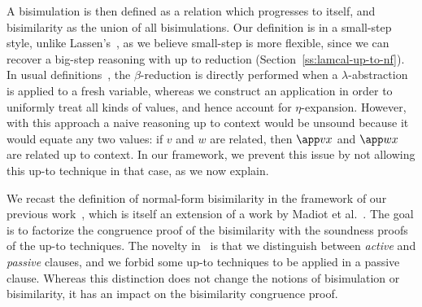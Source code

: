 \documentclass{lmcs}
\theoremstyle{defC}
\begin{document}
\noindent
A bisimulation is then defined as a relation which progresses to itself, and
bisimilarity as the union of all bisimulations. Our definition is in a
small-step style, unlike Lassen's~\cite{Lassen:LICS05}, as we believe small-step
is more flexible, since we can recover a big-step reasoning with up to reduction
(Section~\ref{ss:lamcal-up-to-nf}). In usual
definitions~\cite{Lassen:LICS05,Stoevring-Lassen:POPL07,Biernacki-al:HAL15}, the
$\beta$-reduction is directly performed when a $\lambda$-abstraction is applied
to a fresh variable, whereas we construct an application in order to uniformly
treat all kinds of values, and hence account for $\eta$-expansion. However, with
this approach a naive reasoning up to context would be unsound because it would
equate any two values: if $v$ and $w$ are related, then $\app v x$ and
$\app w x$ are related up to context.  In our framework, we prevent this issue
by not allowing this up-to technique in that case, as we now explain.

We recast the definition of normal-form bisimilarity in the framework of our
previous work~\cite{Aristizabal-al:FSCD16}, which is itself an extension of a
work by Madiot et al.~\cite{Madiot-al:CONCUR14,Madiot:PhD}. The goal is to
factorize the congruence proof of the bisimilarity with the soundness proofs of
the up-to techniques. The novelty in~\cite{Aristizabal-al:FSCD16} is that we
distinguish between \emph{active} and \emph{passive} clauses, and we forbid some
up-to techniques to be applied in a passive clause. Whereas this distinction
does not change the notions of bisimulation or bisimilarity, it has an impact on
the bisimilarity congruence proof.
\end{document}
